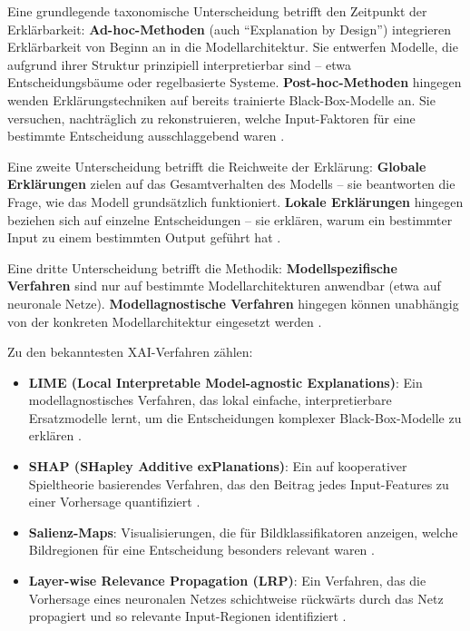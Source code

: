 \documentclass[
  12pt,
  a4paper,
  oneside,
  titlepage
]{article}
\begin{document}
Eine grundlegende taxonomische Unterscheidung betrifft den Zeitpunkt der 
Erklärbarkeit: \textbf{Ad-hoc-Methoden} (auch \enquote{Explanation by Design}) 
integrieren Erklärbarkeit von Beginn an in die Modellarchitektur. Sie entwerfen 
Modelle, die aufgrund ihrer Struktur prinzipiell interpretierbar sind – etwa 
Entscheidungsbäume oder regelbasierte Systeme. \textbf{Post-hoc-Methoden} hingegen 
wenden Erklärungstechniken auf bereits trainierte Black-Box-Modelle an. Sie 
versuchen, nachträglich zu rekonstruieren, welche Input-Faktoren für eine bestimmte 
Entscheidung ausschlaggebend waren \citep[ S.~92]{BarredoArrieta2020}.

Eine zweite Unterscheidung betrifft die Reichweite der Erklärung: 
\textbf{Globale Erklärungen} zielen auf das Gesamtverhalten des Modells – sie 
beantworten die Frage, wie das Modell grundsätzlich funktioniert. 
\textbf{Lokale Erklärungen} hingegen beziehen sich auf einzelne Entscheidungen – 
sie erklären, warum ein bestimmter Input zu einem bestimmten Output geführt hat 
\citep[ S.~80805]{Ortigossa2024}.

Eine dritte Unterscheidung betrifft die Methodik: \textbf{Modellspezifische Verfahren} 
sind nur auf bestimmte Modellarchitekturen anwendbar (etwa auf neuronale Netze). 
\textbf{Modellagnostische Verfahren} hingegen können unabhängig von der konkreten 
Modellarchitektur eingesetzt werden \citep[ S.~3]{Mersha2024}.

Zu den bekanntesten XAI-Verfahren zählen:

\begin{itemize}
    \item \textbf{LIME (Local Interpretable Model-agnostic Explanations)}: Ein 
    modellagnostisches Verfahren, das lokal einfache, interpretierbare Ersatzmodelle 
    lernt, um die Entscheidungen komplexer Black-Box-Modelle zu erklären 
    \citep[ S.~102]{BarredoArrieta2020}.
    
    \item \textbf{SHAP (SHapley Additive exPlanations)}: Ein auf kooperativer 
    Spieltheorie basierendes Verfahren, das den Beitrag jedes Input-Features zu 
    einer Vorhersage quantifiziert \citep[ S.~104]{BarredoArrieta2020}.
    
    \item \textbf{Salienz-Maps}: Visualisierungen, die für Bildklassifikatoren 
    anzeigen, welche Bildregionen für eine Entscheidung besonders relevant waren 
    \citep{Zhou2019}.
    
    \item \textbf{Layer-wise Relevance Propagation (LRP)}: Ein Verfahren, das die 
    Vorhersage eines neuronalen Netzes schichtweise rückwärts durch das Netz 
    propagiert und so relevante Input-Regionen identifiziert \citep{Montavon2019}.
\end{itemize}
\end{document}
